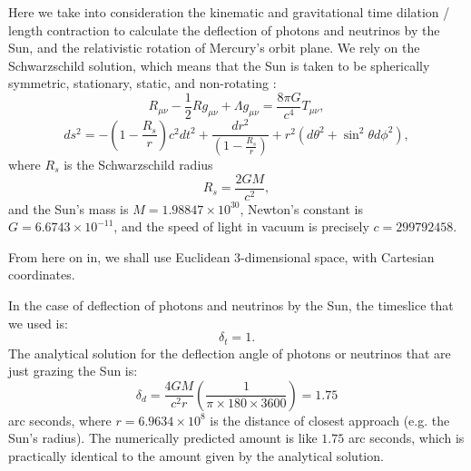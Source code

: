 \documentclass[12pt]{article}
\begin{document}
Here we take into consideration the kinematic and gravitational time dilation / length contraction to calculate the deflection of photons and neutrinos by the Sun, and the relativistic rotation of Mercury's orbit plane.
We rely on the Schwarzschild solution, which means that the Sun is taken to be spherically symmetric, stationary, static, and non-rotating \cite{einstein, misner, schutz, mcmahon}:
\begin{equation}
\label{efe}
R_{\mu\nu} - \frac{1}{2} R g_{\mu\nu} + \Lambda g_{\mu\nu} = \frac{8\pi G}{c^4} T_{\mu\nu},
\end{equation}
\begin{equation}
\label{schwarzschild_line_element}
ds^2 = -\left( 1 - \frac{R_{s}}{r} \right) c^2 dt^2 + \frac{dr^2}{\left( 1 - \frac{R_{s}}{r} \right)} + r^2 (d\theta^2 + \sin^2 \theta d\phi^2),
\end{equation}
where $R_{s}$ is the Schwarzschild radius
\begin{equation}
\label{schwarzschild_radius}
R_{s} = \frac{2GM}{c^2},
\end{equation}
and the Sun's mass is $M = 1.98847 \times 10^{30}$, Newton's constant is $G = 6.6743 \times 10^{-11}$, and the speed of light in vacuum is precisely $c = 299792458$.

From here on in, we shall use Euclidean 3-dimensional space, with Cartesian coordinates.

In the case of deflection of photons and neutrinos by the Sun, the timeslice that we used is:
\begin{equation}
\label{dt_1}
\delta_{t} = 1.
\end{equation}
The analytical solution for the deflection angle of photons or neutrinos that are just grazing the Sun is:
\begin{equation}
\label{delta_d}
\delta_{d} = \frac{4GM}{c^2 r} \left( \frac{1}{\pi \times 180 \times 3600} \right) = 1.75
\end{equation}
arc seconds, where $r = 6.9634 \times 10^8$ is the distance of closest approach (e.g. the Sun's radius).
The numerically predicted amount is like $1.75$ arc seconds, which is practically identical to the amount given by the analytical solution.
\end{document}
